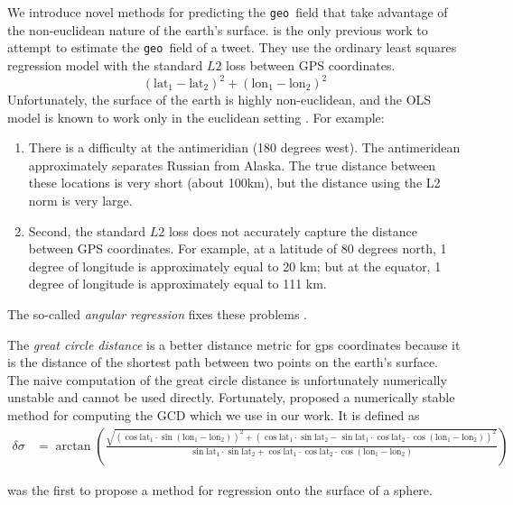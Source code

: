 \documentclass{article}
\newcommand{\tweetdata}[1]{{\texttt{#1}~}}
\newcommand{\geo          }{\tweetdata{geo}}
\newcommand{\lata}{\text{lat}_1}
\newcommand{\latb}{\text{lat}_2}
\newcommand{\latd}{(\lata-\latb)}
\newcommand{\lona}{\text{lon}_1}
\newcommand{\lonb}{\text{lon}_2}
\newcommand{\lond}{(\lona-\lonb)}
\begin{document}
We introduce novel methods for predicting the \geo field that take advantage of the non-euclidean nature of the earth's surface.
\citet{duong2016near} is the only previous work to attempt to estimate the \geo field of a tweet.
They use the ordinary least squares regression model with the standard $L2$ loss between GPS coordinates.
\begin{equation}
    \latd^2 + \lond^2
\end{equation}
Unfortunately, the surface of the earth is highly non-euclidean, 
and the OLS model is known to work only in the euclidean setting \citep[e.g.][]{fisher1992regression}.
For example:
\begin{enumerate}
    \item
        There is a difficulty at the antimeridian (180 degrees west).
        The antimeridean approximately separates Russian from Alaska.
        The true distance between these locations is very short (about 100km),
        but the distance using the L2 norm is very large.
    \item
        Second, the standard $L2$ loss does not accurately capture the distance between GPS coordinates.
        For example, at a latitude of 80 degrees north, 1 degree of longitude is approximately equal to 20 km;
        but at the equator, 1 degree of longitude is approximately equal to 111 km.
\end{enumerate}

The so-called \emph{angular regression} fixes these problems \citep{fisher1992regression}.

The \emph{great circle distance} is a better distance metric for gps coordinates because it is the distance of the shortest path between two points on the earth's surface.
The naive computation of the great circle distance is unfortunately numerically unstable and cannot be used directly.
Fortunately, \citet{vincenty1975direct} proposed a numerically stable method for computing the GCD which we use in our work.
It is defined as
\begin{align}
    \delta\sigma 
    &=
    \arctan\left(
        \frac
        {\sqrt{(\cos\lata\cdot\sin\lond)^2 + (\cos\lata\cdot\sin\latb-\sin\lata\cdot\cos\latb\cdot\cos\lond)^2}}
        {\sin\lata\cdot\sin\latb + \cos\lata\cdot\cos\latb\cdot\cos\lond}
    \right)
\end{align}

\citet{fisher1992regression} was the first to propose a method for regression onto the surface of a sphere.


\end{document}
